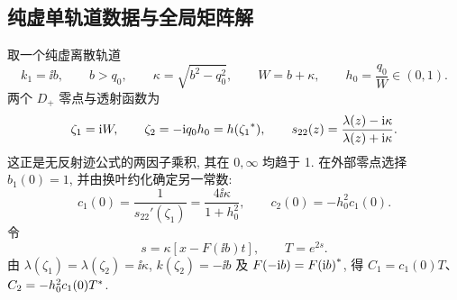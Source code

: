 \subsection{纯虚单轨道数据与全局矩阵解}
取一个纯虚离散轨道
\begin{equation}\label{eq:imaginarypoint}
k_1=\ii b,\qquad b>q_0,\qquad
\kappa=\sqrt{b^2-q_0^2},\qquad W=b+\kappa,\qquad h_0=\dfrac{q_0}{W}\in(0,1).
\end{equation}
两个 $D_+$ 零点与透射函数为
\begin{equation}\label{eq:onezeros}
\zeta_1=\mathrm{i} W,\qquad \zeta_2=-\mathrm{i} q_0h_0=h({\zeta_1}^{*}),\qquad
s_{22}(z)=\dfrac{\lambda(z)-\mathrm{i}\kappa}{\lambda(z)+\mathrm{i}\kappa}.
\end{equation}
这正是无反射迹公式的两因子乘积, 其在 $0,\infty$ 均趋于 1. 在外部零点选择 $b_1(0)=1$, 并由换叶约化确定另一常数:
\begin{equation}\label{eq:onec}
c_1(0)=\dfrac{1}{s_{22}'(\zeta_1)}=\dfrac{4\ii\kappa}{1+h_0^2},\qquad
c_2(0)=-h_0^2c_1(0).
\end{equation}
令
\begin{equation}\label{eq:orbit-phase}
s=\kappa[x-F(\ii b)t],\qquad T=e^{2s}.
\end{equation}
由 $\lambda(\zeta_1)=\lambda(\zeta_2)=\ii\kappa$, $k(\zeta_2)=-\ii b$ 及 $F(-\mathrm{i} b)={F(\mathrm{i} b)}^{*}$, 得 $C_1=c_1(0)T$、$C_2=-h_0^2c_1(0){T}^{*}$.

